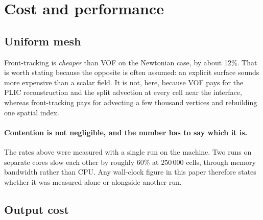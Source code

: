 \section{Cost and performance}
\label{sec:cost}


\subsection{Uniform mesh}

\begin{table}[htbp]
\centering
\caption{Measured cost in microseconds per cell-step, single core, uniform mesh.
Same mesh and same conditions for both methods.}
\label{tab:cost}
\small
{}
\end{table}

Front-tracking is \emph{cheaper} than VOF on the Newtonian case, by about 12\%.
That is worth stating because the opposite is often assumed: an explicit surface
sounds more expensive than a scalar field. It is not, here, because VOF pays for
the PLIC reconstruction and the split advection at every cell near the
interface, whereas front-tracking pays for advecting a few thousand vertices and
rebuilding one spatial index.

\paragraph{Contention is not negligible, and the number has to say which it is.}
The rates above were measured with a single run on the machine. Two runs on
separate cores slow each other by roughly 60\% at $250\,000$ cells, through
memory bandwidth rather than CPU. Any wall-clock figure in this paper therefore
states whether it was measured alone or alongside another run.

\subsection{Output cost}

